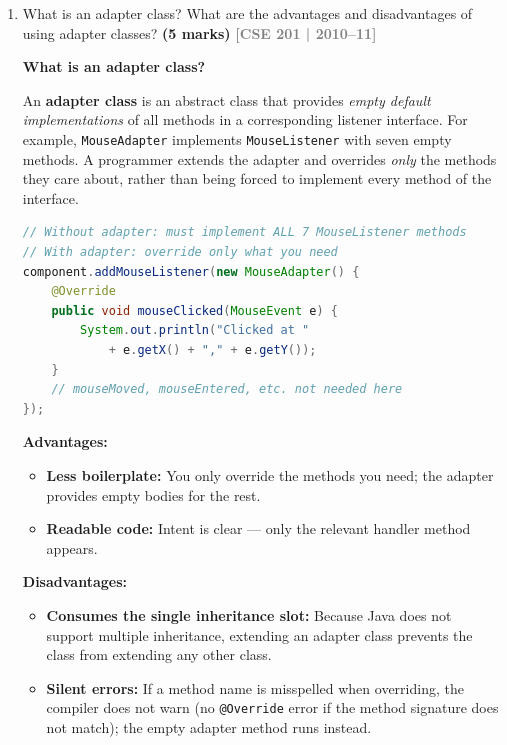 \documentclass[12pt,a3paper]{article}
\newcommand{\yr}[1]{\hfill\textcolor{gray}{\small\textbf{[#1]}}}
\newcommand{\mk}[1]{\textcolor{orange!70!black}{\small\textbf{(#1 marks)}}}
\begin{document}
\begin{enumerate}
\item What is an adapter class? What are the advantages and disadvantages of using adapter classes? \mk{5}
\yr{CSE 201 | 2010--11}

\begin{tcolorbox}[enhanced,breakable,ansbox,
  colback=cC!4,colframe=cC,boxrule=0.8pt,arc=5pt,
  title={\textbf{Answer — Adapter Classes: Definition,
  Advantages and Disadvantages}},
  fonttitle=\bfseries\color{white},colbacktitle=cC]

\textbf{What is an adapter class?}

An \textbf{adapter class} is an abstract class that
provides \emph{empty default implementations} of all
methods in a corresponding listener interface. For
example, \texttt{MouseAdapter} implements
\texttt{MouseListener} with seven empty methods. A
programmer extends the adapter and overrides
\emph{only} the methods they care about, rather than
being forced to implement every method of the
interface.

\begin{lstlisting}[language=Java]
// Without adapter: must implement ALL 7 MouseListener methods
// With adapter: override only what you need
component.addMouseListener(new MouseAdapter() {
    @Override
    public void mouseClicked(MouseEvent e) {
        System.out.println("Clicked at "
            + e.getX() + "," + e.getY());
    }
    // mouseMoved, mouseEntered, etc. not needed here
});
\end{lstlisting}

\medskip
\textbf{Advantages:}
\begin{itemize}[itemsep=2pt]
  \item \textbf{Less boilerplate:} You only override
  the methods you need; the adapter provides empty
  bodies for the rest.
  \item \textbf{Readable code:} Intent is clear ---
  only the relevant handler method appears.
\end{itemize}

\textbf{Disadvantages:}
\begin{itemize}[itemsep=2pt]
  \item \textbf{Consumes the single inheritance
  slot:} Because Java does not support multiple
  inheritance, extending an adapter class prevents
  the class from extending any other class.
  \item \textbf{Silent errors:} If a method name
  is misspelled when overriding, the compiler does
  not warn (no \texttt{@Override} error if the
  method signature does not match); the empty
  adapter method runs instead.
\end{itemize}


\end{tcolorbox}
\end{enumerate}
\end{document}
